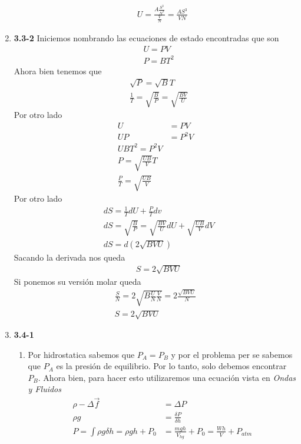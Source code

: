\documentclass[12pt]{exam}
\begin{document}
\begin{enumerate}
\begin{enumerate}
\begin{align*}
					U=\frac{A\frac{S^3}{N^3}}{\frac{V}{N}}=\frac{AS^3}{VN}
				\end{align*}
		\end{enumerate}
	\item \textbf{3.3-2}
		Iniciemos nombrando las ecuaciones de estado encontradas que son
		\begin{align*}
			&U=PV\\
			&P=BT^2
		\end{align*}
		Ahora bien tenemos que
		\begin{align*}
			&\sqrt{P}=\sqrt{B}T\\
			&\frac{1}{T}=\sqrt{\frac{B}{P}}=\sqrt{\frac{BV}{U}}	
		\end{align*}
		Por otro lado
		\begin{align*}
			U&=PV\\
			UP &= P^2V\\
			UBT^2 = P^2V\\
			P = \sqrt{\frac{UB}{V}}T\\
			\frac{P}{T} = \sqrt{\frac{UB}{V}}
		\end{align*}
		Por otro lado
		\begin{align*}
			&dS = \frac{1}{T}dU + \frac{P}{T}dv\\
			&dS = \sqrt{\frac{B}{P}}=\sqrt{\frac{BV}{U}}dU	+ \sqrt{\frac{UB}{V}}dV\\
			&dS = d\left(2\sqrt{BVU}\right)
		\end{align*}
		Sacando la derivada nos queda
		\begin{align*}
			&S =  2\sqrt{BVU}
		\end{align*}
		Si ponemos su versión molar queda
		\begin{align*}
			\frac{S}{N} = 2\sqrt{B\frac{U}{N}\frac{V}{N}}=2\frac{\sqrt{BVU}}{N}\\
			S=2\sqrt{BVU}
		\end{align*}
	\item \textbf{\textbf{3.4-1}}
		\begin{enumerate}
			\item Por hidrostatica sabemos que $P_A = P_B$ y por el problema per se sabemos que $P_A$ es la presión de equilibrio. Por lo tanto, solo debemos encontrar $P_B$. Ahora bien, para hacer esto utilizaremos una ecuación vista en \textit{Ondas y Fluidos}
				\begin{align*}
					\rho - \varDelta \Vec{f}	&= \varDelta P\\
					\rho g &= \frac{\delta P}{\delta h}\\
					P = \int \rho g \delta h = \rho g h + P_0 &= \frac{mgh}{V_{hg}}+P_0=\frac{Wh}{V} + P_{atm}

\end{align*}
\end{enumerate}
\end{enumerate}
\end{document}
